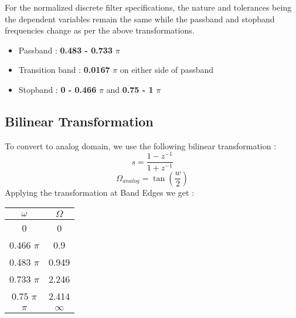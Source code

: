 \documentclass{article}
\begin{document}
\vspace{1em}
\noindent
For the normalized discrete filter specifications, the nature and tolerances being the dependent variables remain the same while the passband and stopband frequencies change as per the above transformations. 
\begin{itemize}
    \item Passband : \textbf{0.483 -  0.733} {$\pi$}
    \item  Transition band : \textbf{0.0167} $\pi$ on either side of passband
    \item Stopband : \textbf{0 - 0.466} {$\pi$} and \textbf{0.75 - 1} {$\pi$}
\end{itemize}


\subsection{Bilinear Transformation}
To convert to analog domain, we use the following bilinear transformation :
\begin{equation*}
    s = \frac{1 - z^{-1}}{1 + z^{-1}}
\end{equation*}
\begin{equation*}
    \Omega_{analog} = \tan (\frac{w}{2})
\end{equation*}
Applying the transformation at Band Edges we get :
\begin{table}[H]
		\begin{center}
		\begin{tabular}{|c|c|}
			\hline
			$\omega$ & $\Omega$\\
			
			\hline
                0 & 0\\
                \hline
                0.466 $\pi$ & 0.9 \\
                \hline
                0.483 $\pi$ & 0.949\\
                \hline
                0.733 $\pi$ & 2.246\\
                \hline
                0.75 $\pi$ & 2.414\\
                \hline
                $\pi$ & $\infty$\\
                \hline
            
		\end{tabular}
		\end{center}
\end{table}
\end{document}
